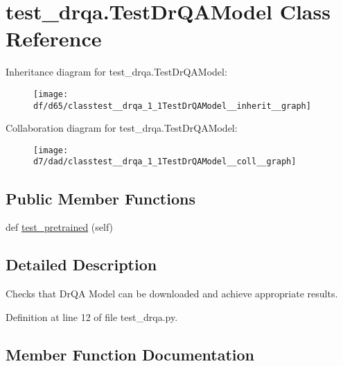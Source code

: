 \hypertarget{classtest__drqa_1_1TestDrQAModel}{}\section{test\+\_\+drqa.\+Test\+Dr\+Q\+A\+Model Class Reference}
\label{classtest__drqa_1_1TestDrQAModel}


Inheritance diagram for test\+\_\+drqa.\+Test\+Dr\+Q\+A\+Model\+:\nopagebreak
\begin{figure}[H]
\begin{center}
\leavevmode
\texttt{[image: df/d65/classtest\_\_drqa\_1\_1TestDrQAModel\_\_inherit\_\_graph]}
\end{center}
\end{figure}


Collaboration diagram for test\+\_\+drqa.\+Test\+Dr\+Q\+A\+Model\+:\nopagebreak
\begin{figure}[H]
\begin{center}
\leavevmode
\texttt{[image: d7/dad/classtest\_\_drqa\_1\_1TestDrQAModel\_\_coll\_\_graph]}
\end{center}
\end{figure}
\subsection*{Public Member Functions}
\begin{DoxyCompactItemize}
\item 
def \hyperlink{classtest__drqa_1_1TestDrQAModel_a7d1c0902015b2a1fb0d208e89c7adb93}{test\+\_\+pretrained} (self)
\end{DoxyCompactItemize}


\subsection{Detailed Description}
\begin{DoxyVerb}Checks that DrQA Model can be downloaded and achieve appropriate results.
\end{DoxyVerb}
 

Definition at line 12 of file test\+\_\+drqa.\+py.



\subsection{Member Function Documentation}
\mbox{\label{classtest__drqa_1_1TestDrQAModel_a7d1c0902015b2a1fb0d208e89c7adb93}} 
